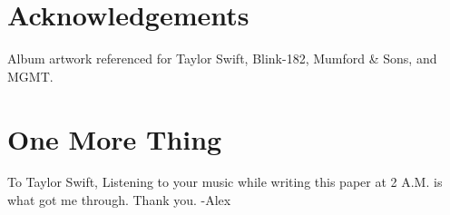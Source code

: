\documentclass[conference]{IEEEtran}
\begin{document}
\section*{Acknowledgements}
Album artwork referenced for Taylor Swift, Blink-182, Mumford \& Sons, and MGMT.
\newline
\section*{One More Thing}
To Taylor Swift,
\newline
\newline
Listening to your music while writing this paper at 2 A.M. 
is what got me through. 
\newline
\newline
Thank you.
\newline
\newline
-Alex
\end{document}
